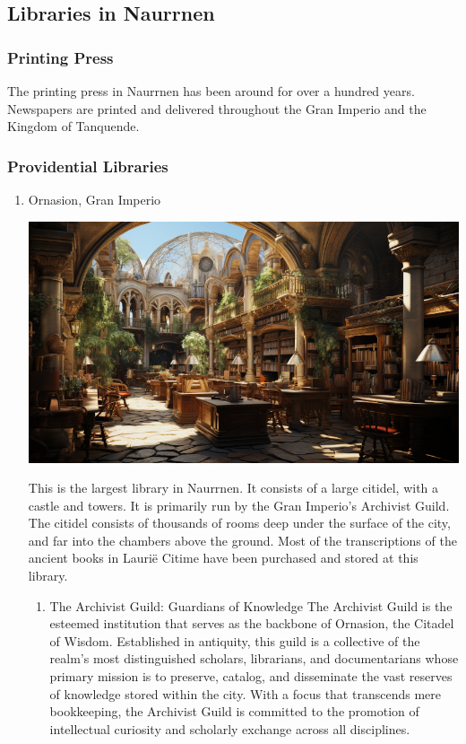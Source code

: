 \documentclass[11pt]{article}
\begin{document}
\subsection{Libraries in Naurrnen}
\label{sec:orgc1a9bb3}
\subsubsection{Printing Press}
\label{sec:org5541084}
The printing press in Naurrnen has been around for over a hundred years. Newspapers are printed and delivered throughout the Gran Imperio and the Kingdom of Tanquende.
\subsubsection{Providential Libraries}
\label{sec:org0332593}
\begin{enumerate}
\item Ornasion, Gran Imperio
\label{sec:org7f7488a}
\begin{center}
\includegraphics[width=500px]{./img/Ornasion-library-3.png}
\end{center}
This is the largest library in Naurrnen. It consists of a large citidel, with a castle and towers. It is primarily run by the Gran Imperio's Archivist Guild. The citidel consists of thousands of rooms deep under the surface of the city, and far into the chambers above the ground. Most of the transcriptions of the ancient books in Laurië Citime have been purchased and stored at this library.
\begin{enumerate}
\item The Archivist Guild: Guardians of Knowledge
\label{sec:org76779cd}
The Archivist Guild is the esteemed institution that serves as the backbone of Ornasion, the Citadel of Wisdom. Established in antiquity, this guild is a collective of the realm's most distinguished scholars, librarians, and documentarians whose primary mission is to preserve, catalog, and disseminate the vast reserves of knowledge stored within the city. With a focus that transcends mere bookkeeping, the Archivist Guild is committed to the promotion of intellectual curiosity and scholarly exchange across all disciplines.


\end{enumerate}
\end{enumerate}
\end{document}
